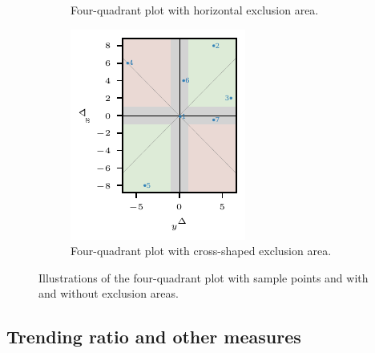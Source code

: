 \begin{figure}
\begin{subfigure}[t]{.24\textwidth}
\caption{Four-quadrant plot with horizontal exclusion area.} \label{fig:trending_basic_4q_excl_axis}
\end{subfigure}\hspace{0.01\textwidth}%
\begin{subfigure}[t]{.24\textwidth}
\includegraphics{plots/illustrative_examples/4q_excl_cross}
\caption{Four-quadrant plot with cross-shaped exclusion area.}\label{fig:trending_basic_4q_excl_cross}
\end{subfigure}%
\caption{Illustrations of the four-quadrant plot with sample points and with and without exclusion areas. }
\label{fig:trending_4q}
\end{figure}

\subsection{Trending ratio and other measures}\label{subsec:trending-measures}


